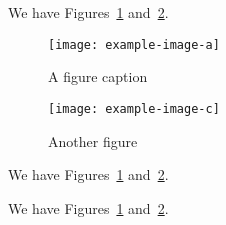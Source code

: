 \documentclass{article}
\begin{document}
We have Figures~\ref{fig:caption-a} and~\ref{fig:caption-c}.

\begin{figure}[ht]
  \centering\texttt{[image: example-image-a]}
  \caption{A figure caption}\label{fig:caption-a}
\end{figure}


\begin{figure}[ht]
  \centering\texttt{[image: example-image-c]}
  \caption{Another figure}\label{fig:caption-c}
\end{figure}

We have Figures~\ref{fig:caption-a} and~\ref{fig:caption-c}.

\pagebreak
We have Figures~\ref{fig:caption-a} and~\ref{fig:caption-c}.

\makeatletter

\readlatex@ypos

\readlatex@ypos

\readlatex@ypos

\readlatex@ypos
\end{document}
